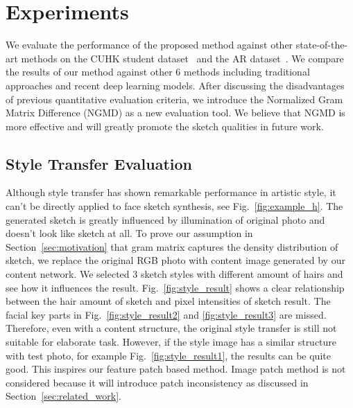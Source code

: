 \documentclass[10pt,twocolumn,letterpaper]{article}
\begin{document}
\section{Experiments}

We evaluate the performance of the proposed method against other state-of-the-art methods on the CUHK student dataset~\cite{wang2009face} and the AR dataset~\cite{martinez1998r}. We compare the results of our method against other 6 methods including traditional approaches and recent deep learning models. After discussing the disadvantages of previous quantitative evaluation criteria, we introduce the Normalized Gram Matrix Difference (NGMD) as a new evaluation tool. We believe that NGMD is more effective and will greatly promote the sketch qualities in future work.

\subsection{Style Transfer Evaluation}

Although style transfer has shown remarkable performance in artistic style, it can't be directly applied to face sketch synthesis, see Fig.~\ref{fig:example_h}. The generated sketch is greatly influenced by illumination of original photo and doesn't look like sketch at all. To prove our assumption in Section~\ref{sec:motivation} that gram matrix captures the density distribution of sketch, we replace the original RGB photo with content image generated by our content network. We selected 3 sketch styles with different amount of hairs and see how it influences the result. Fig.~\ref{fig:style_result} shows a clear relationship between the hair amount of sketch and pixel intensities of sketch result. The facial key parts in Fig.~\ref{fig:style_result2} and \ref{fig:style_result3} are missed. Therefore, even with a content structure, the original style transfer is still not suitable for elaborate task. However, if the style image has a similar structure with test photo, for example Fig.~\ref{fig:style_result1}, the results can be quite good. This inspires our feature patch based method. Image patch method is not considered because it will introduce patch inconsistency as discussed in Section~\ref{sec:related_work}. 
\end{document}
